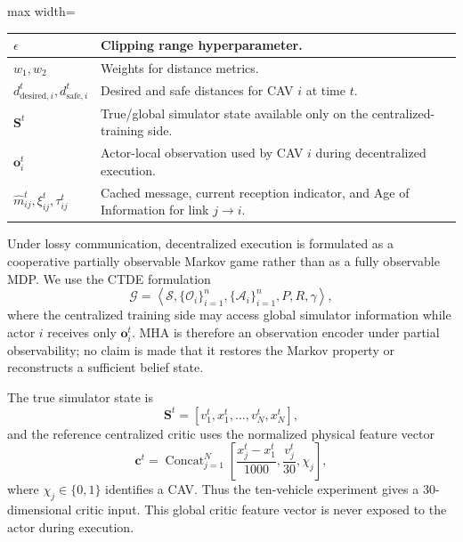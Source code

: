 \documentclass{ieeeaccess}
\begin{document}
\begin{table}[htbp]
\begin{adjustbox}{max width=\linewidth}
\begin{tabular}{|>{\centering\arraybackslash}m{2.8cm}|>{\centering\arraybackslash}m{10.2cm}|}
\hline
$\epsilon$ & Clipping range hyperparameter. \\
\hline
$w_1, w_2$ & Weights for distance metrics. \\
\hline
$d_{\text{desired},i}^{t}, d_{\text{safe},i}^{t}$ & Desired and safe distances for CAV $i$ at time $t$. \\
\hline
$\mathbf{S}^{t}$ & True/global simulator state available only on the centralized-training side. \\
\hline
$\mathbf{o}_{i}^{t}$ & Actor-local observation used by CAV $i$ during decentralized execution. \\
\hline
$\hat m_{ij}^{t},\xi_{ij}^{t},\tau_{ij}^{t}$ & Cached message, current reception indicator, and Age of Information for link $j\rightarrow i$. \\
\hline
\end{tabular}
\end{adjustbox}
\end{table}


Under lossy communication, decentralized execution is formulated as a cooperative partially observable Markov game rather than as a fully observable MDP. We use the CTDE formulation
\begin{equation}
\mathcal{G}=\left\langle \mathcal{S},\{\mathcal{O}_{i}\}_{i=1}^{n},
\{\mathcal{A}_{i}\}_{i=1}^{n},P,R,\gamma\right\rangle ,
\end{equation}
where the centralized training side may access global simulator information while actor $i$ receives only $\mathbf{o}_{i}^{t}$. MHA is therefore an observation encoder under partial observability; no claim is made that it restores the Markov property or reconstructs a sufficient belief state.

The true simulator state is
\begin{equation}
\mathbf{S}^{t}=[v_{1}^{t},x_{1}^{t},\ldots,v_{N}^{t},x_{N}^{t}],
\end{equation}
and the reference centralized critic uses the normalized physical feature vector
\begin{equation}
\mathbf{c}^{t}=\operatorname{Concat}_{j=1}^{N}
\left[
\frac{x_j^t-x_1^t}{1000},
\frac{v_j^t}{30},
\chi_j
\right],
\end{equation}
where $\chi_j\in\{0,1\}$ identifies a CAV. Thus the ten-vehicle experiment gives a $30$-dimensional critic input. This global critic feature vector is never exposed to the actor during execution. %
\end{document}
